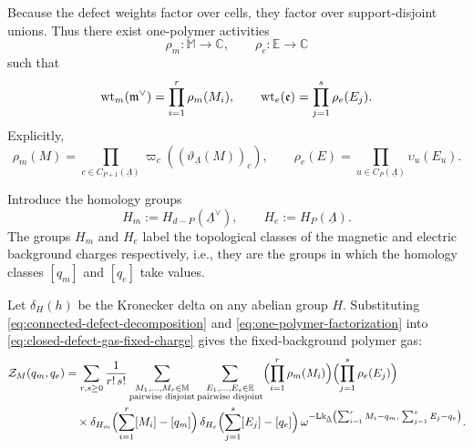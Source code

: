 Because the defect weights factor over cells, they factor over support-disjoint unions.
Thus there exist one-polymer activities
\begin{equation}
	\rho_m:\mathbb M \to \mathbb C,
	\qquad
	\rho_e:\mathbb E \to \mathbb C
\end{equation}
such that
\begin{equation}
	\mathrm{wt}_m(\mathfrak m^\vee)=\prod_{i=1}^r \rho_m(M_i),
	\qquad
	\mathrm{wt}_e(\mathfrak e)=\prod_{j=1}^s \rho_e(E_j).
	\label{eq:one-polymer-factorization}
\end{equation}
Explicitly,
\begin{equation}
	\rho_m(M)
	=
	\prod_{c\in C_{P+1}(\underline\Lambda)}
	\varpi_c \left((\vartheta_{\underline\Lambda}(M))_c\right),
	\qquad
	\rho_e(E)
	=
	\prod_{u\in C_P(\underline\Lambda)}\upsilon_u(E_u).
	\label{eq:one-polymer-activities-fixed-charge}
\end{equation}

Introduce the homology groups
\begin{equation}
	H_m:=H_{d-P}(\underline\Lambda^\vee),
	\qquad
	H_e:=H_P(\underline\Lambda).
	\label{eq:fixed-charge-homology-groups}
\end{equation}
The groups $H_m$ and $H_e$ label the topological classes of the magnetic and electric background charges respectively, i.e., they are the groups in which the homology classes \([q_m]\) and \([q_e]\) take values.

Let $\delta_H(h)$ be the Kronecker delta on any abelian group $H$. Substituting \eqref{eq:connected-defect-decomposition} and
\eqref{eq:one-polymer-factorization} into
\eqref{eq:closed-defect-gas-fixed-charge} gives the fixed-background polymer gas:
\begin{equation}
\begin{aligned}
	\mathcal Z_M(q_m,q_e)
	&=
	\sum_{r,s\ge 0}
	\frac{1}{r!\,s!}
	\sum_{\substack{M_1,\dots,M_r\in \mathbb M \\
			\text{pairwise disjoint}}}
	\sum_{\substack{E_1,\dots,E_s\in \mathbb E \\
			\text{pairwise disjoint}}}
	\Bigl(\prod_{i=1}^r \rho_m(M_i)\Bigr)
	\Bigl(\prod_{j=1}^s \rho_e(E_j)\Bigr)
	\\
	&\quad\times
	\delta_{H_m} \Bigl(\sum_{i=1}^r [M_i]-[q_m]\Bigr)\,
	\delta_{H_e} \Bigl(\sum_{j=1}^s [E_j]-[q_e]\Bigr)\,
	\omega^{-
		\mathrm{Lk}_{\underline\Lambda}
		\left(
		\sum_{i=1}^r M_i-q_m,\;
		\sum_{j=1}^s E_j-q_e
		\right)
	}.
\end{aligned}
\label{eq:fixed-charge-polymer-gas}
\end{equation}

